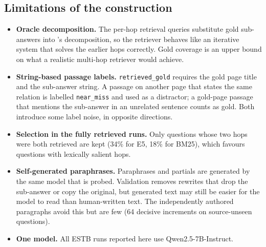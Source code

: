 \subsection{Limitations of the construction}
\label{app:estb-limits}
\begin{itemize}
  \item \textbf{Oracle decomposition.} The per-hop retrieval queries substitute gold sub-answers into \musique{}'s decomposition, so the retriever behaves like an iterative system that solves the earlier hops correctly. Gold coverage is an upper bound on what a realistic multi-hop retriever would achieve.
  \item \textbf{String-based passage labels.} \texttt{retrieved\_gold} requires the gold page title and the sub-answer string. A passage on another page that states the same relation is labelled \texttt{near\_miss} and used as a distractor; a gold-page passage that mentions the sub-answer in an unrelated sentence counts as gold. Both introduce some label noise, in opposite directions.
  \item \textbf{Selection in the fully retrieved runs.} Only questions whose two hops were both retrieved are kept (34\% for E5, 18\% for BM25), which favours questions with lexically salient hops.
  \item \textbf{Self-generated paraphrases.} Paraphrases and partials are generated by the same model that is probed. Validation removes rewrites that drop the sub-answer or copy the original, but generated text may still be easier for the model to read than human-written text. The independently authored paragraphs avoid this but are few (64 decisive increments on source-unseen questions).
  \item \textbf{One model.} All ESTB runs reported here use Qwen2.5-7B-Instruct.
\end{itemize}
